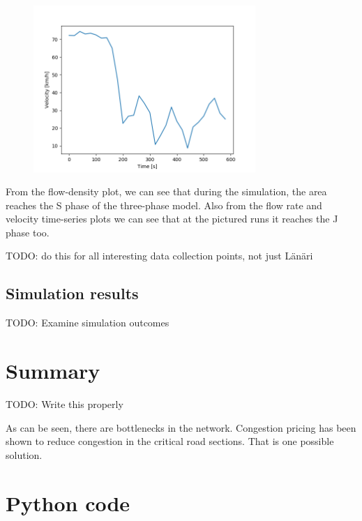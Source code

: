 \documentclass[english, 12pt, a4paper, elec, utf8, pdfa, online]{aaltothesis}
\begin{document}
\begin{figure}[h]
    \centering
    \includegraphics[width=0.75\textwidth]{graphs/Länsiväylä_2_spd_time_8.png}
\end{figure}

From the flow-density plot, we can see that during the simulation, the area reaches the S phase of the three-phase model. Also from the flow rate and velocity time-series plots we can see that at the pictured runs it reaches the J phase too.

TODO: do this for all interesting data collection points, not just Länäri

\subsection{Simulation results}

TODO: Examine simulation outcomes


\clearpage

\section{Summary}

TODO: Write this properly

As can be seen, there are bottlenecks in the network. Congestion pricing has been shown to reduce congestion in the critical road sections. That is one possible solution.

\clearpage

\thesisbibliography

{}


\clearpage

\thesisappendix

\section{Python code}
\end{document}
